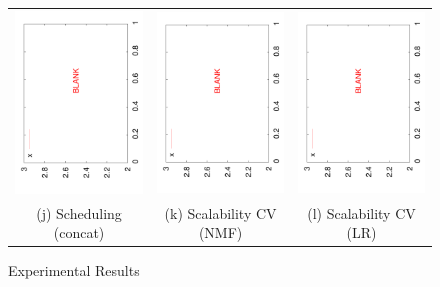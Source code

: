 \documentclass{vldb}
\begin{document}
\begin{figure}
\begin{tabular}{ccc}
\includegraphics[angle=-90,width=2.3in]{blank.pdf} &
\hspace*{-0.2in}
\includegraphics[angle=-90,width=2.3in]{blank.pdf} &
\hspace*{-0.2in}
\includegraphics[angle=-90,width=2.3in]{blank.pdf} \\
(j) Scheduling (concat) & (k) Scalability CV (NMF) & (l) Scalability CV (LR) \\

\end{tabular}

\caption{Experimental Results}
\label{fig:results}
\end{figure}
\end{document}
